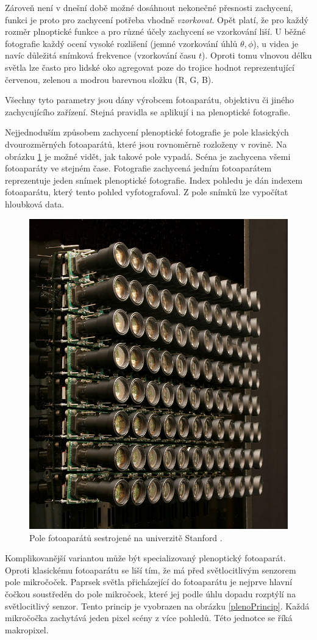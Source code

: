 Zároveň není v dnešní době možné dosáhnout nekonečné přesnosti zachycení, funkci je proto pro zachycení potřeba vhodně \textit{vzorkovat}.
Opět platí, že pro každý rozměr plnoptické funkce a pro různé účely zachycení se vzorkování liší.
U běžné fotografie každý ocení vysoké rozlišení (jemné vzorkování úhlů $\theta, \phi$), u videa je navíc důležitá snímková frekvence (vzorkování času $t$).
Oproti tomu vlnovou délku světla lze často pro lidské oko agregovat poze do trojice hodnot reprezentující červenou, zelenou a modrou barevnou složku (R, G, B).

Všechny tyto parametry jsou dány výrobcem fotoaparátu, objektivu či jiného zachycujícího zařízení.
Stejná pravidla se aplikují i na plenoptické fotografie.


Nejjednoduším způsobem zachycení plenoptické fotografie je pole klasických dvourozměrných fotoaparátů, které jsou rovnoměrně rozloženy v rovině.
Na obrázku \ref{stanfordArray} je možné vidět, jak takové pole vypadá.
Scéna je zachycena všemi fotoaparáty ve stejném čase.
Fotografie zachycená jedním fotoaparátem reprezentuje jeden snímek plenoptické fotografie.
Index pohledu je dán indexem fotoaparátu, který tento pohled vyfotografoval.
Z pole snímků lze vypočítat hloubková data.

\label{light-field-capture}
\begin{figure}[h]
  \centering
  \includegraphics[width=.4\textwidth]{obrazky-figures/stanford-array.jpg}
	\caption{Pole fotoaparátů sestrojené na univerzitě Stanford \cite{stanford}.}
	\label{stanfordArray}
\end{figure}

Komplikovanější variantou může být specializovaný plenoptický fotoaparát.
Oproti klasickému fotoaparátu se liší tím, že má před světlocitlivým senzorem pole mikročoček.
Paprsek světla přicházející do fotoaparátu je nejprve hlavní čočkou soustředěn do pole mikročoek, které jej podle úhlu dopadu rozptýlí na světlocitlivý senzor.
Tento princip je vyobrazen na obrázku \ref{plenoPrincip}.
Každá mikročočka zachytává jeden pixel scény z více pohledů.
Této jednotce se říká makropixel.

